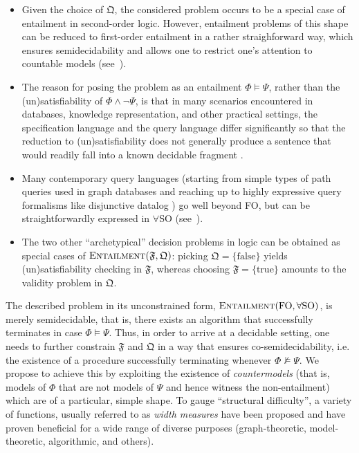\begin{itemize}
\item Given the choice of $\mathfrak{Q}$, the considered problem occurs to be a special case of entailment in second-order logic.
However, entailment problems of this shape can be reduced to first-order entailment in a rather straighforward way, which  ensures semidecidability %
and allows one to restrict one's attention to countable models (see~).
 
\item The reason for posing the problem as an entailment $\Phi \models \Psi$, rather than the (un)satisfiability of $\Phi \wedge \neg \Psi$, is that in many scenarios encountered in databases, knowledge representation, and other practical settings, the specification language and the query language differ significantly so that the reduction to (un)satisfiability does not generally produce a sentence that would readily fall into a known decidable fragment \cite{%
CalvaneseGL98,CalvaneseEO09,RudolphG10,OrtizS12,BaranyGO13}.

\item Many contemporary query languages (starting from simple types of path queries used in graph databases \cite{FlorescuLS98} and reaching up to highly expressive query formalisms like disjunctive datalog \cite{EiterGM97}) go well beyond FO, but can be straightforwardly expressed in $\forall$SO (see~).

\item The two other ``archetypical'' decision problems in logic can be obtained as special cases of $\textsc{Entailment}(\mathfrak{F},\mathfrak{Q})$: picking $\mathfrak{Q}=\{\mathrm{false}\}$ yields (un)satisfiability checking in $\mathfrak{F}$, whereas choosing $\mathfrak{F}=\{\mathrm{true}\}$ amounts to the validity problem in $\mathfrak{Q}$.
\end{itemize}

The described problem in its unconstrained form, $\textsc{Entailment}(\mathrm{FO},\forall\mathrm{SO})$, is merely semidecidable, that is, there exists an algorithm that successfully terminates in case $\Phi \models \Psi$. Thus, in order to arrive at a decidable setting, one needs to further constrain $\mathfrak{F}$ and $\mathfrak{Q}$ in a way that ensures co-semidecidability, i.e. the existence of a procedure successfully terminating whenever $\Phi \not\models \Psi$. %
We propose to achieve this by exploiting the existence of \emph{countermodels} (that is, models of $\Phi$ that are not models of $\Psi$ and hence witness the non-entailment) which are of a particular, simple shape.
%
To gauge ``structural difficulty'', a variety of functions, usually referred to as \emph{width measures} have been proposed and have proven beneficial for a wide range of diverse purposes (graph-theoretic, model-theoretic, algorithmic, and others). 

